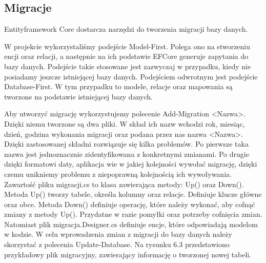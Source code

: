 \documentclass[a4paper,twoside,12pt]{book}
\begin{document}
\subsection{Migracje}
Entityframework Core dostarcza narzędzi do tworzenia migracji bazy danych.  

W projekcie wykorzystaliśmy podejście Model-First. Polega ono na stworzeniu encji oraz relacji, a następnie na ich podstawie EFCore generuje zapytania do bazy danych. Podejście takie stosowane jest zazwyczaj w przypadku, kiedy nie posiadamy jeszcze istniejącej bazy danych. Podejściem odwrotnym jest podejście Database-First. W tym przypadku to modele, relacje oraz mapowania są tworzone na podstawie istniejącej bazy danych. 

Aby utworzyć migrację wykorzystujemy polecenie Add-Migration <Nazwa>. Dzięki niemu tworzone są dwa pliki. W skład ich nazw wchodzi rok, miesiąc, dzień, godzina wykonania migracji oraz podana przez nas nazwa <Nazwa>. Dzięki zastosowanej składni rozwiązuje się kilka problemów. Po pierwsze taka nazwa jest jednoznacznie zidentyfikowana z konkretnymi zmianami. Po drugie dzięki formatowi daty, aplikacja wie w jakiej kolejności wywołać migrację, dzięki czemu unikniemy problemu z niepoprawną kolejnością ich wywoływania. 
Zawartość pliku migracji.cs to klasa zawierająca metody: Up() oraz Down(). Metoda Up() tworzy tabele, określa kolumny oraz relacje. Definiuje klucze główne oraz obce. Metoda Down() definiuje operację, które należy wykonać, aby cofnąć zmiany z metody Up(). Przydatne w razie pomyłki oraz potrzeby cofnięcia zmian.
Natomiast plik migracja.Designer.cs definiuje encje, które odpowiadają modelom w kodzie.
W celu wprowadzenia zmian z migracji do bazy danych należy skorzystać z polecenia Update-Database. Na rysunku 6.3 przedstawiono przykładowy plik migracyjny, zawierający informację o tworzonej nowej tabeli.
\newpage
\end{document}
